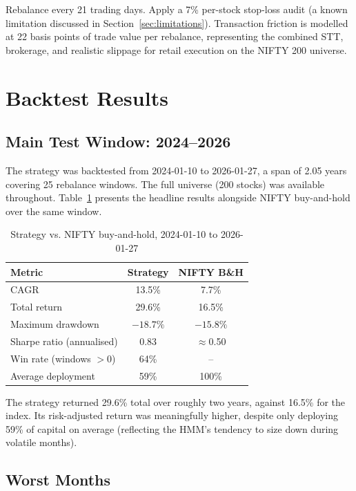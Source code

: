 \documentclass[conference]{IEEEtran}
\begin{document}
Rebalance every 21 trading days. Apply a 7\% per-stock stop-loss audit (a known limitation discussed in Section~\ref{sec:limitations}). Transaction friction is modelled at 22 basis points of trade value per rebalance, representing the combined STT, brokerage, and realistic slippage for retail execution on the NIFTY 200 universe.

\section{Backtest Results}

\subsection{Main Test Window: 2024--2026}

The strategy was backtested from 2024-01-10 to 2026-01-27, a span of 2.05 years covering 25 rebalance windows. The full universe (200 stocks) was available throughout. Table~\ref{tab:main-results} presents the headline results alongside NIFTY buy-and-hold over the same window.

\begin{table}[htbp]
\caption{Strategy vs. NIFTY buy-and-hold, 2024-01-10 to 2026-01-27}
\label{tab:main-results}
\centering
\begin{tabular}{lcc}
\toprule
\textbf{Metric} & \textbf{Strategy} & \textbf{NIFTY B\&H} \\
\midrule
CAGR & 13.5\% & 7.7\% \\
Total return & 29.6\% & 16.5\% \\
Maximum drawdown & $-18.7\%$ & $-15.8\%$ \\
Sharpe ratio (annualised) & 0.83 & $\approx$0.50 \\
Win rate (windows $>0$) & 64\% & -- \\
Average deployment & 59\% & 100\% \\
\bottomrule
\end{tabular}
\end{table}

The strategy returned 29.6\% total over roughly two years, against 16.5\% for the index. Its risk-adjusted return was meaningfully higher, despite only deploying 59\% of capital on average (reflecting the HMM's tendency to size down during volatile months).

\subsection{Worst Months}
\end{document}
